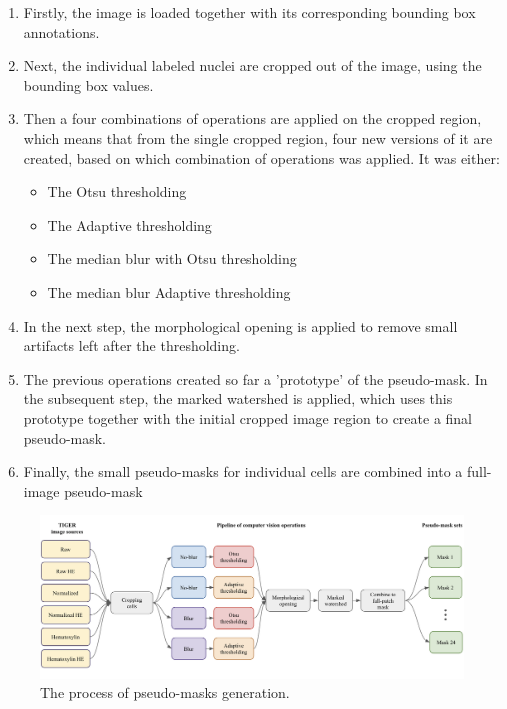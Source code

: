 \begin{enumerate}
    \item Firstly, the image is loaded together with its corresponding bounding box annotations.
    \item Next, the individual labeled nuclei are cropped out of the image, using the bounding box values.
    \item Then a four combinations of operations are applied on the cropped region, which means that from the single cropped region, four new versions of it are created, based on which combination of operations was applied. It was either:
    \begin{itemize}
        \item The Otsu thresholding
        \item The Adaptive thresholding
        \item The median blur with Otsu thresholding
        \item The median blur Adaptive thresholding
    \end{itemize}
    \item In the next step, the morphological opening is applied to remove small artifacts left after the thresholding.
    \item The previous operations created so far a 'prototype' of the pseudo-mask. In the subsequent step, the marked watershed is applied, which uses this prototype together with the initial cropped image region to create a final pseudo-mask.
    \item Finally, the small pseudo-masks for individual cells are combined into a full-image pseudo-mask
\end{enumerate}

\begin{figure}[H]
\begin{centering}
\includegraphics[width=\textwidth]{assets/images/for_presentation/dg-mask-gen.png}
\par\end{centering}
\caption{The process of pseudo-masks generation. 
\label{fig:dg-mask-gen}}
\end{figure}

